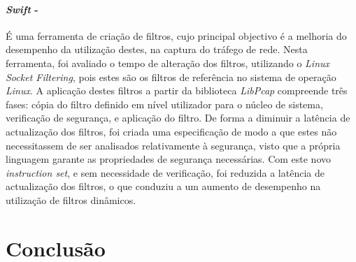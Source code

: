 \paragraph*{\textit{Swift} - }
É uma ferramenta de criação de filtros, cujo principal objectivo é a melhoria do desempenho da utilização destes, na captura do tráfego de rede.
Nesta ferramenta, foi avaliado o tempo de alteração dos filtros, utilizando o \textit{Linux Socket Filtering}, pois estes são os filtros de referência no sistema de operação \textit{Linux}.
A aplicação destes filtros a partir da biblioteca \textit{LibPcap} compreende três fases: cópia do filtro definido em nível utilizador para o núcleo de sistema, verificação de segurança, e aplicação do filtro.
De forma a diminuir a latência de actualização dos filtros, foi criada uma especificação de modo a que estes não necessitassem de ser analisados relativamente à segurança, visto que a própria linguagem garante as propriedades de segurança necessárias.
Com este novo \textit{instruction set}, e sem necessidade de verificação, foi reduzida a latência de actualização dos filtros, o que conduziu a um aumento de desempenho na utilização de filtros dinâmicos.











\section{Conclusão}

